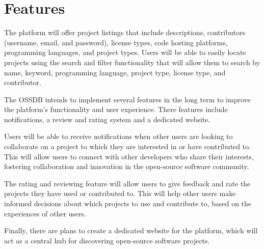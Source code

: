 \pagebreak
\section{Features}
The platform will offer project listings that include descriptions, contributors
(username, email, and password), license types, code hosting platforms,
programming languages, and project types.
Users will be able to easily locate projects using the search and filter functionality that will allow them
to search by name, keyword, programming language, project type, license type, and contributor.

The OSSDB intends to implement several features in the long term to improve the platform's
functionality and user experience.
There features include notifications, a review and rating system and a dedicated website. 

Users will be able to receive notifications when other users are looking to collaborate
on a project to which they are interested in or have contributed to.
This will allow users to connect with other developers who share their interests,
fostering collaboration and innovation in the open-source software community. 

The rating and reviewing feature will allow users to give feedback and rate the
projects they have used or contributed to.
This will help other users make informed decisions about which projects
to use and contribute to, based on the experiences of other users. 

Finally, there are plans to create a dedicated website for the platform,
which will act as a central hub for discovering open-source software projects. 
